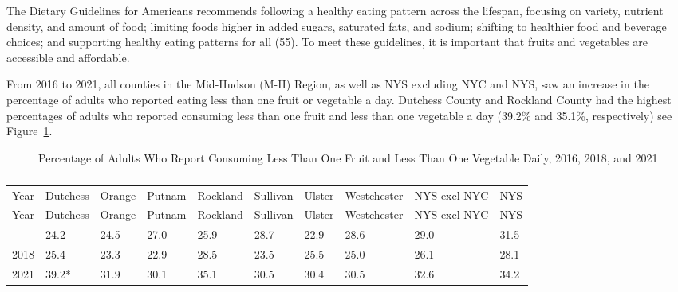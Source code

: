 \documentclass[
  english,
  letterpaper,
]{report}
\begin{document}
The Dietary Guidelines for Americans recommends following a healthy
eating pattern across the lifespan, focusing on variety, nutrient
density, and amount of food; limiting foods higher in added sugars,
saturated fats, and sodium; shifting to healthier food and beverage
choices; and supporting healthy eating patterns for all (55). To meet
these guidelines, it is important that fruits and vegetables are
accessible and affordable.

From 2016 to 2021, all counties in the Mid-Hudson (M-H) Region, as well
as NYS excluding NYC and NYS, saw an increase in the percentage of
adults who reported eating less than one fruit or vegetable a day.
Dutchess County and Rockland County had the highest percentages of
adults who reported consuming less than one fruit and less than one
vegetable a day (39.2\% and 35.1\%, respectively) see
Figure~\ref{fig-brfss-fruit-veg}.

\begin{figure}


\caption{\label{fig-brfss-fruit-veg}Percentage of Adults Who Report
Consuming Less Than One Fruit and Less Than One Vegetable Daily, 2016,
2018, and 2021}

\end{figure}%

\begin{longtable}[]{@{}llllllllll@{}}

\caption{\label{tbl-brfss-adult-fruit-veg}Percentage of Adults Who
Report Consuming Less Than One Fruit and Less Than One Vegetable Daily,
2016, 2018, and 2021}

\tabularnewline

\caption{}\label{T_81a7a}\tabularnewline
\toprule\noalign{}
Year & Dutchess & Orange & Putnam & Rockland & Sullivan & Ulster &
Westchester & NYS excl NYC & NYS \\
\midrule\noalign{}
\endfirsthead
\toprule\noalign{}
Year & Dutchess & Orange & Putnam & Rockland & Sullivan & Ulster &
Westchester & NYS excl NYC & NYS \\
\midrule\noalign{}
\endhead
\bottomrule\noalign{}
\endlastfoot
2016 & 24.2 & 24.5 & 27.0 & 25.9 & 28.7 & 22.9 & 28.6 & 29.0 & 31.5 \\
2018 & 25.4 & 23.3 & 22.9 & 28.5 & 23.5 & 25.5 & 25.0 & 26.1 & 28.1 \\
2021 & 39.2* & 31.9 & 30.1 & 35.1 & 30.5 & 30.4 & 30.5 & 32.6 & 34.2 \\

\end{longtable}
\end{document}
